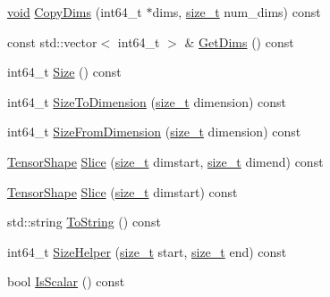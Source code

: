 \begin{DoxyCompactItemize}
\item 
\mbox{\hyperlink{mlasi_8h_a88f941d423cb2a819b70a1358982b1a6}{void}} \mbox{\hyperlink{classonnxruntime_1_1TensorShape_a43fc07106b872f36ed139e0a20b94818}{Copy\+Dims}} (int64\+\_\+t $\ast$dims, \mbox{\hyperlink{mlasi_8h_a503efbc1c6e50825320ad909366b78ab}{size\+\_\+t}} num\+\_\+dims) const
\item 
const std\+::vector$<$ int64\+\_\+t $>$ \& \mbox{\hyperlink{classonnxruntime_1_1TensorShape_a37834c200e4b93c78a836db93d9aaa5a}{Get\+Dims}} () const
\item 
int64\+\_\+t \mbox{\hyperlink{classonnxruntime_1_1TensorShape_a01f6e6fbc270702141c4c45573667cd5}{Size}} () const
\item 
int64\+\_\+t \mbox{\hyperlink{classonnxruntime_1_1TensorShape_af322918934d44918346fe19526f52897}{Size\+To\+Dimension}} (\mbox{\hyperlink{mlasi_8h_a503efbc1c6e50825320ad909366b78ab}{size\+\_\+t}} dimension) const
\item 
int64\+\_\+t \mbox{\hyperlink{classonnxruntime_1_1TensorShape_a4a084e4fe8348af11cf8cf1d22c4800d}{Size\+From\+Dimension}} (\mbox{\hyperlink{mlasi_8h_a503efbc1c6e50825320ad909366b78ab}{size\+\_\+t}} dimension) const
\item 
\mbox{\hyperlink{classonnxruntime_1_1TensorShape}{Tensor\+Shape}} \mbox{\hyperlink{classonnxruntime_1_1TensorShape_a996be17420fdb94cd5de15301a50d9be}{Slice}} (\mbox{\hyperlink{mlasi_8h_a503efbc1c6e50825320ad909366b78ab}{size\+\_\+t}} dimstart, \mbox{\hyperlink{mlasi_8h_a503efbc1c6e50825320ad909366b78ab}{size\+\_\+t}} dimend) const
\item 
\mbox{\hyperlink{classonnxruntime_1_1TensorShape}{Tensor\+Shape}} \mbox{\hyperlink{classonnxruntime_1_1TensorShape_aa4a71819ef5121d26e404e2efd022623}{Slice}} (\mbox{\hyperlink{mlasi_8h_a503efbc1c6e50825320ad909366b78ab}{size\+\_\+t}} dimstart) const
\item 
std\+::string \mbox{\hyperlink{classonnxruntime_1_1TensorShape_a3e0292984f1378d4b6c8bf58550da147}{To\+String}} () const
\item 
int64\+\_\+t \mbox{\hyperlink{classonnxruntime_1_1TensorShape_a85c717aa5d4607765c55a461a5b6f754}{Size\+Helper}} (\mbox{\hyperlink{mlasi_8h_a503efbc1c6e50825320ad909366b78ab}{size\+\_\+t}} start, \mbox{\hyperlink{mlasi_8h_a503efbc1c6e50825320ad909366b78ab}{size\+\_\+t}} end) const
\item 
bool \mbox{\hyperlink{classonnxruntime_1_1TensorShape_a5c57c44b3f248614e3066a70e5d1a701}{Is\+Scalar}} () const
\end{DoxyCompactItemize}

